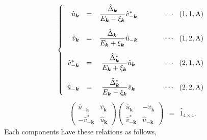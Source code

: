 \documentclass[uplatex,a4j,12pt,dvipdfmx]{jsarticle}
\begin{document}
\begin{eqnarray}
	\left\{
	\begin{array}{rccl}
		\hat{u}_{\bm{k}}
		 & =                                      &
		\dfrac{ \hat{\Delta}_{\bm{k}} }{ E_{\bm{k}} - \xi_{\bm{k}} }
		\hat{v}_{-\bm{k}}^{*}
		 & \hspace{10mm} \cdots \ \ (1,1,{\rm A})
		\\[5mm]
		\hat{v}_{\bm{k}}
		 & =                                      &
		\dfrac{ \hat{\Delta}_{\bm{k}} }{ E_{\bm{k}} + \xi_{\bm{k}} } \hat{u}_{-\bm{k}}
		 & \hspace{10mm} \cdots \ \ (1,2,{\rm A})
		\\[5mm]
		\hat{v}_{-\bm{k}}^{*}
		 & =                                      &
		\dfrac{ \hat{\Delta}^{*}_{\bm{k}} }{ E_{\bm{k}} + \xi_{\bm{k}} } \hat{u}_{\bm{k}}
		 & \hspace{10mm} \cdots \ \ (2,1,{\rm A})
		\\[5mm]
		\hat{u}_{-\bm{k}}
		 & =                                      &
		\dfrac{ \hat{\Delta}^{*}_{\bm{k}} }{ E_{\bm{k}} - \xi_{\bm{k}} } \hat{v}_{\bm{k}}
		 & \hspace{10mm} \cdots \ \ (2,2,{\rm A})
	\end{array}
	\right.
\end{eqnarray}
%
	\begin{eqnarray}
		\left(
		\begin{array}{cc}
				\hat{u}_{-\bm{k}}        & \hat{v}_{\bm{k}} \\[2mm]
				- \hat{v}_{- \bm{k}}^{*} & \hat{u}_{\bm{k}}
			\end{array}
		\right)
		\!\!\!
		\left(
		\begin{array}{cc}
				\hat{u}_{\bm{k}}       & - \hat{v}_{\bm{k}} \\[2mm]
				\hat{v}_{- \bm{k}}^{*} & \hat{u}_{-\bm{k}}
			\end{array}
		\right)
		\ \ = \ \
		\hat{1}_{4 \times 4}
		.
	\end{eqnarray}
	Each components have these relations as follows,
\end{document}
